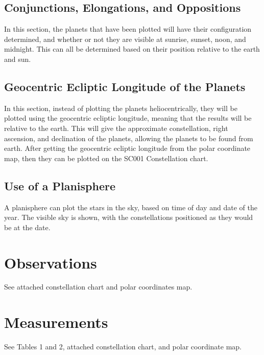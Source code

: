 \documentclass{article}
\begin{document}
\subsection{Conjunctions, Elongations, and Oppositions}
In this section, the planets that have been plotted will have their configuration determined, and whether or not they are visible at sunrise, sunset, noon, and midnight.  This can all be determined based on their position relative to the earth and sun.
\subsection{Geocentric Ecliptic Longitude of the Planets}
In this section, instead of plotting the planets heliocentrically, they will be plotted using the geocentric ecliptic longitude, meaning that the results will be relative to the earth.  This will give the approximate constellation, right ascension, and declination of the planets, allowing the planets to be found from earth.  After getting the geocentric ecliptic longitude from the polar coordinate map, then they can be plotted on the SC001 Constellation chart.
\subsection{Use of a Planisphere}
A planisphere can plot the stars in the sky, based on time of day and date of the year.  The visible sky is shown, with the constellations positioned as they would be at the date. 
\section{Observations}
See attached constellation chart and polar coordinates map. 
\section{Measurements}
See Tables 1 and 2, attached constellation chart, and polar coordinate map.
\end{document}
